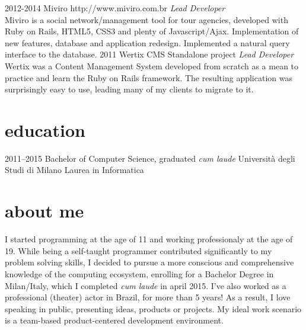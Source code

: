 \documentclass[]{friggeri-cv} %
\begin{document}
\begin{entrylist}
\entry
{2012-2014}
{Miviro}
{http://www.miviro.com.br}
{\emph{Lead Developer} \\
Miviro is a social network/management tool for tour agencies, developed with 
Ruby on Rails, HTML5, CSS3 and plenty of Javascript/Ajax. Implementation of new
features, database and application redesign.
Implemented a natural query interface to the database.
}
\entry
{2011}
{Wertix CMS}
{Standalone project}
{\emph{Lead Developer} \\
Wertix was a Content Management System developed from scratch as a mean to 
practice and learn the Ruby on Rails framework. The resulting application 
was surprisingly easy to use, leading many of my clients to migrate to 
it.
}
\end{entrylist}


\section{education}
\begin{entrylist}
\entry
{2011--2015}
{Bachelor {\normalfont of Computer Science, graduated \textit{cum laude}}}
{Università degli Studi di Milano}
{Laurea in Informatica}
\end{entrylist}

\section{about me}
I started programming at the age of 11 and working professionaly at the age of 19. 
While being a self-taught programmer contributed significantly to my problem 
solving skills, I decided to pursue a more conscious and comprehensive 
knowledge of the computing ecosystem, enrolling for a Bachelor Degree in 
Milan/Italy, which I completed \textit{cum laude} in april 2015. I've also worked as a 
professional (theater) actor in Brazil, for more than 5 years! As a result, 
I love speaking in public, presenting ideas, products or projects. 
My ideal work scenario is a team-based product-centered development environment.
\end{document}
